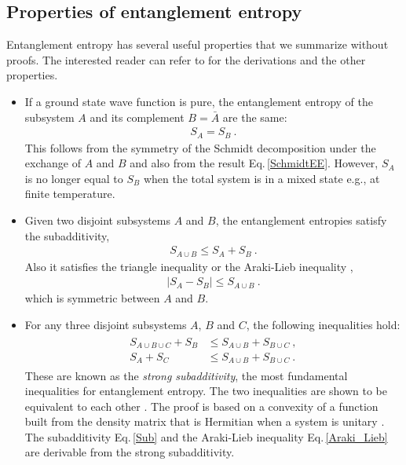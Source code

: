 \subsection{Properties of entanglement entropy}
\label{ss:prop EE}
Entanglement entropy has several useful properties that we summarize without proofs.
The interested reader can refer to \textcite{nielsen2010quantum} for the derivations and the other properties.
\begin{itemize}
\item If a ground state wave function is pure, the entanglement entropy of the subsystem $A$ and its complement $B= \bar A$ are the same:
\begin{align} 
S_A=S_B\ . \label{ext}
\end{align}
This follows from the symmetry of the Schmidt decomposition under the exchange of $A$ and $B$ and also from the result Eq.\,\eqref{SchmidtEE}.
However, $S_A$ is no longer equal to $S_B$ when the total system is in a mixed state e.g., at finite temperature.

\item Given two disjoint subsystems $A$ and $B$, the entanglement entropies satisfy the subadditivity,
\begin{align}\label{Sub}
 S_{A\cup B}\le S_{A}+S_{B} \ .
\end{align}
Also it satisfies the triangle inequality or the Araki-Lieb inequality \cite{Araki:1970ba},
\begin{align}\label{Araki_Lieb}
|S_A - S_B| \le S_{A\cup B} \ .
\end{align}
which is symmetric between $A$ and $B$.

\item
For any three disjoint subsystems $A$, $B$ and $C$,
the following inequalities hold:
\begin{align}\label{SSA}
\begin{aligned}
 S_{A\cup B\cup C} + S_{B} &\le S_{A\cup B}+S_{B\cup C} \ ,  \\
 S_{A} + S_{C} &\le S_{A\cup B}+S_{B\cup C} \ .
\end{aligned}
\end{align}
These are known as the {\it strong subadditivity}, the most fundamental inequalities for entanglement entropy.
The two inequalities are shown to be equivalent to each other \cite{Araki:1970ba}.
The proof is based on a convexity of a function built from the density matrix that is Hermitian when a system is unitary \cite{Lieb:1973cp,Narnhofer:1985aq}.
The subadditivity Eq.\,\eqref{Sub} and the Araki-Lieb inequality Eq.\,\eqref{Araki_Lieb} are derivable from the strong subadditivity.
\end{itemize}

